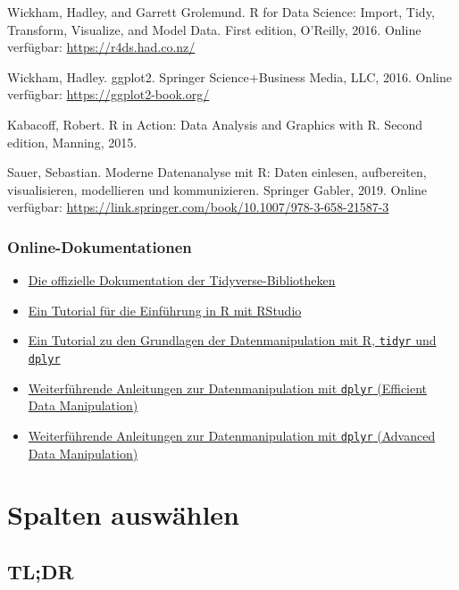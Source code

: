 \documentclass[
]{book}
\providecommand{\tightlist}{%
  \setlength{\itemsep}{0pt}\setlength{\parskip}{0pt}}
\begin{document}
Wickham, Hadley, and Garrett Grolemund. R for Data Science: Import, Tidy, Transform, Visualize, and Model Data. First edition, O'Reilly, 2016. Online verfügbar: \href{https://r4ds.had.co.nz}{https://r4ds.had.co.nz/}

Wickham, Hadley. ggplot2. Springer Science+Business Media, LLC, 2016. Online verfügbar: \href{https://ggplot2-book.org}{https://ggplot2-book.org/}

Kabacoff, Robert. R in Action: Data Analysis and Graphics with R. Second edition, Manning, 2015.

Sauer, Sebastian. Moderne Datenanalyse mit R: Daten einlesen, aufbereiten, visualisieren, modellieren und kommunizieren. Springer Gabler, 2019. Online verfügbar: \url{https://link.springer.com/book/10.1007/978-3-658-21587-3}

\hypertarget{online-dokumentationen}{%
\subsection{Online-Dokumentationen}\label{online-dokumentationen}}

\begin{itemize}
\tightlist
\item
  \href{https://www.tidyverse.org/}{Die offizielle Dokumentation der Tidyverse-Bibliotheken}
\item
  \href{https://ourcodingclub.github.io/tutorials/intro-to-r/}{Ein Tutorial für die Einführung in R mit RStudio}
\item
  \href{https://ourcodingclub.github.io/tutorials/data-manip-intro/}{Ein Tutorial zu den Grundlagen der Datenmanipulation mit R, \texttt{tidyr} und \texttt{dplyr}}
\item
  \href{https://ourcodingclub.github.io/tutorials/data-manip-efficient/}{Weiterführende Anleitungen zur Datenmanipulation mit \texttt{dplyr} (Efficient Data Manipulation)}
\item
  \href{https://ourcodingclub.github.io/tutorials/data-manip-creative-dplyr/}{Weiterführende Anleitungen zur Datenmanipulation mit \texttt{dplyr} (Advanced Data Manipulation)}
\end{itemize}

\hypertarget{spalten-auswuxe4hlen}{%
\chapter{Spalten auswählen}\label{spalten-auswuxe4hlen}}

\hypertarget{tldr-2}{%
\section*{TL;DR}\label{tldr-2}}
\end{document}
